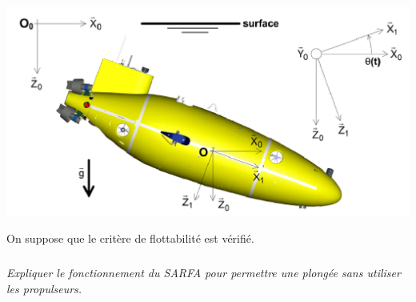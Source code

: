\documentclass[11pt,oneside]{article}
\begin{document}
{\begin{center}
\includegraphics[width=.95\textwidth]{png/fig_11}
\end{center}

On suppose que le critère de flottabilité est vérifié.
}

\subparagraph{}
\textit{Expliquer le fonctionnement du SARFA pour permettre une plongée sans utiliser les propulseurs.}
\end{document}
